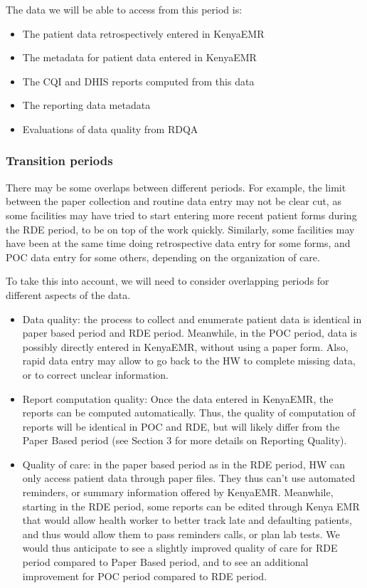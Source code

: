 \documentclass[a4paper,11pt,final,twoside]{article}
\begin{document}
The data we will be able to access from this period is:
\begin{itemize}
\item	The patient data retrospectively entered in KenyaEMR
\item	The metadata for patient data entered in KenyaEMR
\item	The CQI and DHIS reports computed from this data
\item	The reporting data metadata
\item	Evaluations of data quality from RDQA
\end{itemize}

        \subsubsection{Transition periods}

There may be some overlaps between different periods. For example, the limit between the paper collection and routine data entry may not be clear cut, as some facilities may have tried to start entering more recent patient forms during the RDE period, to be on top of the work quickly. Similarly, some facilities may have been at the same time doing retrospective data entry for some forms, and POC data entry for some others, depending on the organization of care.

To take this into account, we will need to consider overlapping periods for different aspects of the data.
\begin{itemize}
\item	Data quality: the process to collect and enumerate patient data is identical in paper based period and RDE period. Meanwhile, in the POC period, data is possibly directly entered in KenyaEMR, without using a paper form. Also, rapid data entry may allow to go back to the HW to complete missing data, or to correct unclear information.
\item	Report computation quality: Once the data entered in KenyaEMR, the reports can be computed automatically. Thus, the quality of computation of reports will be identical in POC and RDE, but will likely differ from the Paper Based period (see Section 3 for more details on Reporting Quality).
\item	Quality of care: in the paper based period as in the RDE period, HW can only access patient data through paper files. They thus can’t use automated reminders, or summary information offered by KenyaEMR. Meanwhile, starting in the RDE period, some reports can be edited through Kenya EMR that would allow health worker to better track late and defaulting patients, and thus would allow them to pass reminders calls, or plan lab tests. We would thus anticipate to see a slightly improved quality of care for RDE period compared to Paper Based period, and to see an additional improvement for POC period compared to RDE period.
\end{itemize}
\end{document}
